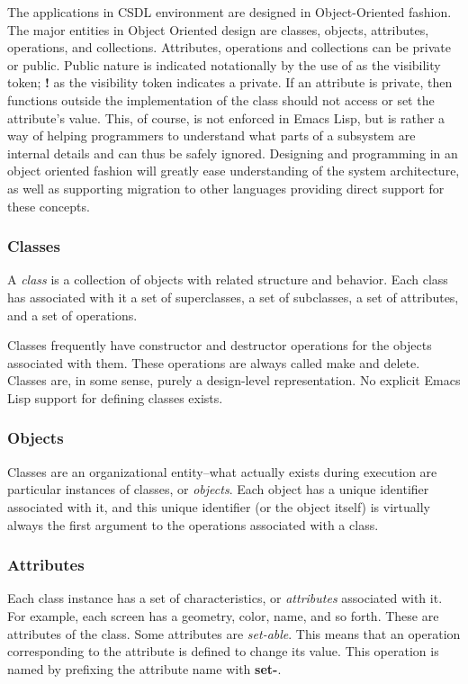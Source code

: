 The applications in CSDL environment are designed in Object-Oriented
fashion.  The major entities in Object Oriented design are classes,
objects, attributes, operations, and collections.  Attributes,
operations and collections can be private or public.  Public nature is
indicated notationally by the use of {\bf *} as the visibility token;
{\bf !} as the visibility token indicates a private.  If an attribute
is private, then functions outside the implementation of the class
should not access or set the attribute's value.  This, of course, is
not enforced in Emacs Lisp, but is rather a way of helping programmers
to understand what parts of a subsystem are internal details and can
thus be safely ignored. Designing and programming in an object
oriented fashion will greatly ease understanding of the system
architecture, as well as supporting migration to other languages
providing direct support for these concepts.

\subsubsection{Classes}  

A {\em class}\/ is a collection of objects with related structure and
behavior.  Each class has associated with it a set of superclasses, a
set of subclasses, a set of attributes, and a set of operations.

Classes frequently have constructor and destructor operations for the objects
associated with them.  These operations are always called {\sf make}
and {\sf delete}. Classes are, in some sense, purely a design-level
representation. No explicit Emacs Lisp support for defining classes
exists.  

\subsubsection{Objects} 

Classes are an organizational entity--what actually exists during
execution are particular instances of classes, or {\em objects}.  Each
object has a unique identifier associated with it, and this unique
identifier (or the object itself) is virtually always the first
argument to the operations associated with a class.

\subsubsection{Attributes}  

Each class instance has a set of characteristics, or {\em
attributes}\/ associated with it.  For example, each screen has a
geometry, color, name, and so forth.  These are attributes of the
class.  Some attributes are {\em set-able}.  This means that an
operation corresponding to the attribute is defined to change its
value. This operation is named by prefixing the attribute name with
{\bf set-}.

